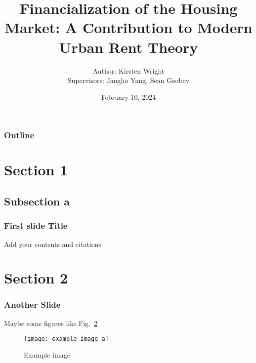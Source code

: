 \documentclass{beamer}
\title{ Financialization of the Housing Market: A Contribution to Modern Urban Rent Theory}
\author{
  Author: Kirsten Wright \\
  Supervisors: Jangho Yang, Sean Geobey
}
\institute{PhD Thesis Defense \\[1ex] University of Waterloo}
\date{February 10, 2024}
\begin{document}

{
    \maketitle
    
}

\begin{frame}
\frametitle{Outline}
\tableofcontents
\end{frame}

\section{Section 1}
\subsection{Subsection a}

\begin{frame}
\begin{figure}[!ht]
\centering
\resizebox{0.85\textwidth}{!}{}
% 
\label{fig-fields}
\end{figure}

\end{frame}
\begin{frame}
    \frametitle{First slide Title}
    \small
    Add your contents and citations %
\end{frame}
\section{Section 2}
\begin{frame}
    \frametitle{Another Slide}
    \small
    Maybe some figures like Fig.~\ref{fig:my_label}
    \begin{figure}
        \centering
        \texttt{[image: example-image-a]}
        \caption{Example image}
        \label{fig:my_label}
    \end{figure}
\end{frame}
\end{document}
